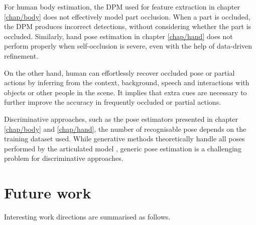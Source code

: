 For human body estimation, the DPM used for feature extraction in chapter \ref{chap/body} does not effectively model part occlusion. When a part is occluded, the DPM produces incorrect detections, without considering whether the part is occluded. Similarly, hand pose estimation in chapter \ref{chap/hand} does not perform properly when self-occlusion is severe, even with the help of data-driven refinement. 

On the other hand, human can effortlessly recover occluded pose or partial actions by inferring from the context, \eg background, speech and interactions with objects or other people in the scene. It implies that extra cues are necessary to further improve the accuracy in frequently occluded or partial actions. 

Discriminative approaches, such as the pose estimators presented in chapter \ref{chap/body} and \ref{chap/hand}, the number of recognisable pose depends on the training dataset used. While generative methods theoretically handle all poses performed by the articulated model \cite{Oikonomidis2011}, generic pose estimation is a challenging problem for discriminative approaches. 

\section{Future work}

Interesting work directions are summarised as follows.

